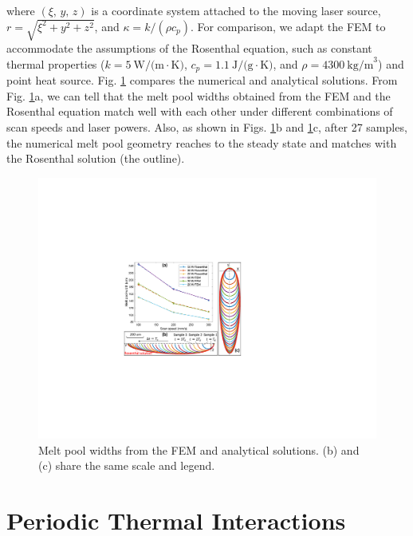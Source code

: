\documentclass [11pt, proquest] {uwthesis}[2020/02/24]
\begin{document}
\noindent where $(\xi,\,y,\,z)$ is a coordinate system attached to
the moving laser source, $r=\sqrt{\xi^{2}+y^{2}+z^{2}}$, and $\kappa=k/(\rho c_{p})$.
For comparison, we adapt the FEM to accommodate the assumptions of
the Rosenthal equation, such as constant thermal properties ($k=5\:\text{W/(m}\cdotp\text{K)}$,
$c_{p}=1.1\:\text{J/(g}\cdotp\text{K)}$, and $\rho=4300\:\text{kg/m}^{3}$)
and point heat source. Fig. \ref{fig:Model-verification:-comparing}
compares the numerical and analytical solutions. From Fig. \ref{fig:Model-verification:-comparing}a,
we can tell that the melt pool widths obtained from the FEM and the
Rosenthal equation match well with each other under different combinations
of scan speeds and laser powers. Also, as shown in Figs. \ref{fig:Model-verification:-comparing}b
and \ref{fig:Model-verification:-comparing}c, after 27 samples, the
numerical melt pool geometry reaches to the steady state and matches
with the Rosenthal solution (the outline). 
\begin{figure}[!ht]
\begin{centering}
\includegraphics[clip,width=12cm]{Closed-loop-simulation/model_verification_rosenthal}
\par\end{centering}
\centering{}\caption{\label{fig:Model-verification:-comparing}Melt pool widths from the
FEM and analytical solutions. (b) and (c) share the same scale and
legend.}
\end{figure}

\section{Periodic Thermal Interactions} \label{sec:Periodic-Thermal-Interactions}
\end{document}
